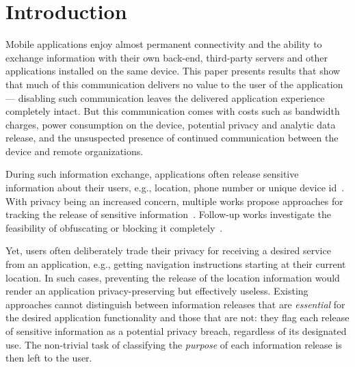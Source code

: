 \section{Introduction}
\label{sec:intro} 

Mobile applications enjoy almost permanent connectivity and the
ability to exchange information with their own back-end, third-party
servers and other applications installed on the same device.
This paper presents results that show that much of this communication
delivers no value to the user of the application --- disabling such
communication leaves the delivered application experience completely
intact. But this communication comes with costs such as bandwidth
charges, power consumption on the device, potential privacy and
analytic data release, and the unsuspected presence of continued
communication between the device and remote organizations. 




During
such information exchange, applications often release sensitive
information about their users, e.g., location, phone number or unique
device id~\cite{Enck:Gilbert:Chun:Cox:Jung:McDaniel:Sheth:OSDI10,
  Egele:Kruegel:Kirda:Vign:NDSS11,Tripp:Rubin:SEC14}.  With privacy
being an increased concern, multiple works propose approaches for
tracking the release of sensitive
information~\cite{Enck:Gilbert:Chun:Cox:Jung:McDaniel:Sheth:OSDI10,Egele:Kruegel:Kirda:Vign:NDSS11,Arzt:Rasthofer:Fritz:Bodden:Bartel:Klein:Traon:Octeau:McDaniel:PLDI14,
  Tripp:Rubin:SEC14,Gordon:Kim:Perkins:Gilham:Nguyen:Rinard:NDSS15}. Follow-up
works investigate the feasibility of obfuscating or blocking it
completely~\cite{Hornyack:Han:Jung:Schechter:Wetherall:CCS11}.

Yet, users often deliberately trade their privacy for receiving a
desired service from an application, e.g., getting navigation
instructions starting at their current location.  In such cases,
preventing the release of the location information would render an
application privacy-preserving but effectively useless.
Existing approaches cannot distinguish between information releases that are \emph{essential} for the desired application functionality and those that are not: 
they flag each release of sensitive information as a potential privacy breach, regardless of its designated use.
The non-trivial task of classifying the \emph{purpose} of each information release is then left to the user. 


